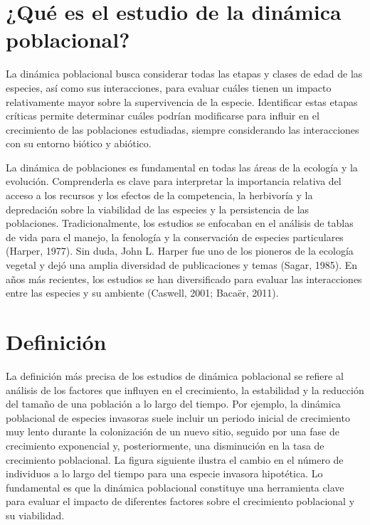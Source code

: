 \documentclass[
  12pt,
  letterpaper,
]{book}
\begin{document}
\chapter{¿Qué es el estudio de la dinámica
poblacional?}\label{quuxe9-es-el-estudio-de-la-dinuxe1mica-poblacional}

La dinámica poblacional busca considerar todas las etapas y clases de
edad de las especies, así como sus interacciones, para evaluar cuáles
tienen un impacto relativamente mayor sobre la supervivencia de la
especie. Identificar estas etapas críticas permite determinar cuáles
podrían modificarse para influir en el crecimiento de las poblaciones
estudiadas, siempre considerando las interacciones con su entorno
biótico y abiótico.

La dinámica de poblaciones es fundamental en todas las áreas de la
ecología y la evolución. Comprenderla es clave para interpretar la
importancia relativa del acceso a los recursos y los efectos de la
competencia, la herbivoría y la depredación sobre la viabilidad de las
especies y la persistencia de las poblaciones. Tradicionalmente, los
estudios se enfocaban en el análisis de tablas de vida para el manejo,
la fenología y la conservación de especies particulares (Harper, 1977).
Sin duda, John L. Harper fue uno de los pioneros de la ecología vegetal
y dejó una amplia diversidad de publicaciones y temas (Sagar, 1985). En
años más recientes, los estudios se han diversificado para evaluar las
interacciones entre las especies y su ambiente (Caswell, 2001; Bacaër,
2011).

\chapter{Definición}\label{definiciuxf3n}

La definición más precisa de los estudios de dinámica poblacional se
refiere al análisis de los factores que influyen en el crecimiento, la
estabilidad y la reducción del tamaño de una población a lo largo del
tiempo. Por ejemplo, la dinámica poblacional de especies invasoras suele
incluir un periodo inicial de crecimiento muy lento durante la
colonización de un nuevo sitio, seguido por una fase de crecimiento
exponencial y, posteriormente, una disminución en la tasa de crecimiento
poblacional. La figura siguiente ilustra el cambio en el número de
individuos a lo largo del tiempo para una especie invasora hipotética.
Lo fundamental es que la dinámica poblacional constituye una herramienta
clave para evaluar el impacto de diferentes factores sobre el
crecimiento poblacional y su viabilidad.
\end{document}
